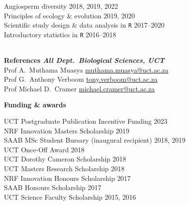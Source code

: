 \documentclass[10pt]{article}
\begin{document}
\begin{multicols}{2}
Angiosperm diversity                         \hfill {\small 2018, 2019, 2022} \\
Principles of ecology \& evolution           \hfill {\small       2019, 2020} \\
Scientific study design \& data analysis in
  \texttt{R}                                 \hfill {\small       2017--2020} \\
Introductory statistics in \texttt{R}        \hfill {\small       2016--2018} \\

\

\textbf{References %
        \hfill {\small \textmd{\textit{All Dept.~Biological Sciences, UCT}}}} \\

Prof A.~Muthama Muasya
      \hfill \href{mailto:muthama.muasya@uct.ac.za}{muthama.muasya@uct.ac.za} \\
Prof G.~Anthony Verboom
      \hfill     \href{mailto:tony.verboom@uct.ac.za}{tony.verboom@uct.ac.za} \\
Prof Michael D.~Cramer
      \hfill \href{mailto:michael.cramer@uct.ac.za}{michael.cramer@uct.ac.za} \\

\columnbreak

\textbf{\large Funding \& awards} %

UCT Postgraduate Publication Incentive Funding     \hfill {\small       2023} \\
NRF Innovation Masters Scholarship                 \hfill {\small       2019} \\
SAAB MSc Student Bursary
  {\small (inaugural recipient)}                   \hfill {\small 2018, 2019} \\
UCT Once-Off Award                                 \hfill {\small       2018} \\
UCT Dorothy Cameron Scholarship                    \hfill {\small       2018} \\
UCT Masters Research Scholarship                   \hfill {\small       2018} \\
NRF Innovation Honours Scholarship                 \hfill {\small       2017} \\
SAAB Honours Scholarship                           \hfill {\small       2017} \\
UCT Science Faculty Scholarship                    \hfill {\small 2015, 2016} \\


\end{multicols}
\end{document}
